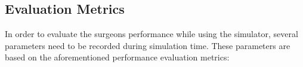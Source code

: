 \subsection{Evaluation Metrics}\label{ssec:evaluation_metrics}



In order to evaluate the surgeons performance while using the simulator, several parameters need to be recorded during simulation time. These parameters are based on the aforementioned performance evaluation metrics:

